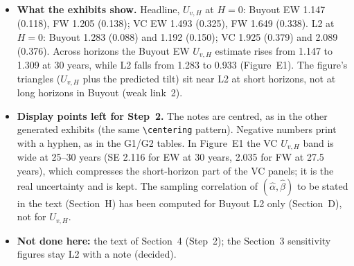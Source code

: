 \documentclass[11pt]{article}
\begin{document}
\begin{itemize}
\item \textbf{What the exhibits show.} Headline, $U_{v,H}$ at $H=0$: Buyout EW 1.147 (0.118), FW 1.205 (0.138); VC EW 1.493 (0.325), FW 1.649 (0.338). L2 at $H=0$: Buyout 1.283 (0.088) and 1.192 (0.150); VC 1.925 (0.379) and 2.089 (0.376). Across horizons the Buyout EW $U_{v,H}$ estimate rises from 1.147 to 1.309 at 30 years, while L2 falls from 1.283 to 0.933 (Figure~E1). The figure's triangles ($U_{v,H}$ plus the predicted tilt) sit near L2 at short horizons, not at long horizons in Buyout (weak link~2).
\item \textbf{Display points left for Step~2.} The notes are centred, as in the other generated exhibits (the same \verb|\centering| pattern). Negative numbers print with a hyphen, as in the G1/G2 tables. In Figure~E1 the VC $U_{v,H}$ band is wide at 25--30 years (SE 2.116 for EW at 30 years, 2.035 for FW at 27.5 years), which compresses the short-horizon part of the VC panels; it is the real uncertainty and is kept. The sampling correlation of $(\hat\alpha,\hat\beta)$ to be stated in the text (Section~H) has been computed for Buyout L2 only (Section~D), not for $U_{v,H}$.
\item \textbf{Not done here:} the text of Section~4 (Step~2); the Section~3 sensitivity figures stay L2 with a note (decided).
\end{itemize}
\end{document}
